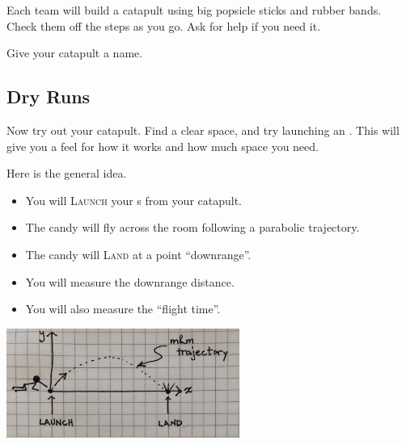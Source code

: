 Each team will build a catapult using big popsicle sticks and rubber bands.
Check them off the steps as you go.
Ask for help if you need it.

Give your catapult a {name}.

\subsection{Dry Runs}

Now try out your catapult. 
Find a clear space, and try launching an \mymm. 
This will give you a feel for how it works and how much space you need.

Here is the general idea.
\begin{itemize}[nosep]
    \item You will {\scshape Launch} your \mymm{}s from your catapult.
    \item The candy will fly across the room following a parabolic trajectory.
    \item The candy will {\scshape Land} at a point ``downrange''.
    \item You will measure the downrange distance.
    \item You will also measure the ``flight time''.
\end{itemize}

\begin{center}
\includegraphics[width=3in]{../launch-and-landing.jpg}
\end{center}

